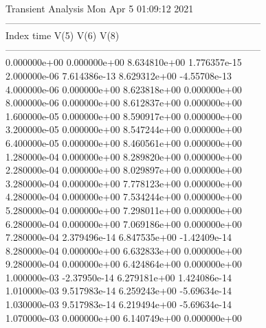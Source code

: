                                    Transient Analysis  Mon Apr  5 01:09:12  2021\\ \hline
--------------------------------------------------------------------------------\\ \hline
Index   time            V(5)            V(6)            V(8)            \\ \hline
--------------------------------------------------------------------------------\\ 	0.000000e+00	0.000000e+00	8.634810e+00	1.776357e-15	\\ 	2.000000e-06	7.614386e-13	8.629312e+00	-4.55708e-13	\\ 	4.000000e-06	0.000000e+00	8.623818e+00	0.000000e+00	\\ 	8.000000e-06	0.000000e+00	8.612837e+00	0.000000e+00	\\ 	1.600000e-05	0.000000e+00	8.590917e+00	0.000000e+00	\\ 	3.200000e-05	0.000000e+00	8.547244e+00	0.000000e+00	\\ 	6.400000e-05	0.000000e+00	8.460561e+00	0.000000e+00	\\ 	1.280000e-04	0.000000e+00	8.289820e+00	0.000000e+00	\\ 	2.280000e-04	0.000000e+00	8.029897e+00	0.000000e+00	\\ 	3.280000e-04	0.000000e+00	7.778123e+00	0.000000e+00	\\ 	4.280000e-04	0.000000e+00	7.534244e+00	0.000000e+00	\\ 	5.280000e-04	0.000000e+00	7.298011e+00	0.000000e+00	\\ 	6.280000e-04	0.000000e+00	7.069186e+00	0.000000e+00	\\ 	7.280000e-04	2.379496e-14	6.847535e+00	-1.42409e-14	\\ 	8.280000e-04	0.000000e+00	6.632833e+00	0.000000e+00	\\ 	9.280000e-04	0.000000e+00	6.424864e+00	0.000000e+00	\\ 	1.000000e-03	-2.37950e-14	6.279181e+00	1.424086e-14	\\ 	1.010000e-03	9.517983e-14	6.259243e+00	-5.69634e-14	\\ 	1.030000e-03	9.517983e-14	6.219494e+00	-5.69634e-14	\\ 	1.070000e-03	0.000000e+00	6.140749e+00	0.000000e+00	\\ \hline
